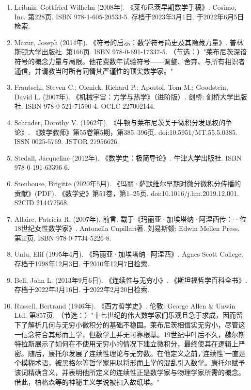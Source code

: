 \begin{enumerate}
\item Leibniz, Gottfried Wilhelm (2008年). 《莱布尼茨早期数学手稿》. Cosimo, Inc. 第228页. ISBN 978-1-605-20533-5. 存档于2023年3月1日. 于2022年6月5日检索.  
\item Mazur, Joseph (2014年). 《符号的启示：数学符号简史及其隐藏力量》. 普林斯顿大学出版社. 第166页. ISBN 978-0-691-17337-5.  
（节选：）"莱布尼茨深谙符号的概念力量与局限。他花费数年试验符号——调整、舍弃、与所有相识者通信，并请教当时所有同情其严谨性的顶尖数学家。"  
\item Frautschi, Steven C.; Olenick, Richard P.; Apostol, Tom M.; Goodstein, David L. (2007年). 《机械宇宙：力学与热学》（进阶版）. 剑桥: 剑桥大学出版社. ISBN 978-0-521-71590-4. OCLC 227002144.  

\item Schrader, Dorothy V. (1962年). 《牛顿与莱布尼茨关于微积分发现权的争论》. 《数学教师》第55卷第5期，第385–396页. doi:10.5951/MT.55.5.0385. ISSN 0025-5769. JSTOR 27956626.  

\item Stedall, Jacqueline (2012年). 《数学史：极简导论》. 牛津大学出版社. ISBN 978-0-191-63396-6.  

\item Stenhouse, Brigitte (2020年5月). 《玛丽·萨默维尔早期对微分微积分传播的贡献》(PDF). 《数学史》第51卷，第1–25页. doi:10.1016/j.hm.2019.12.001. S2CID 214472568.  

\item Allaire, Patricia R. (2007年). 前言. 载于《玛丽亚·加埃塔纳·阿涅西传：一位18世纪女性数学家》. Antonella Cupillari著. 刘易斯顿: Edwin Mellen Press. 第iii页. ISBN 978-0-7734-5226-8.  

\item Unlu, Elif (1995年4月). 《玛丽亚·加埃塔纳·阿涅西》. Agnes Scott College. 存档于1998年12月3日. 于2010年12月7日检索.  

\item Bell, John L. (2013年9月6日). 《连续性与无穷小》. 《斯坦福哲学百科全书》. 存档于2022年3月16日. 于2022年2月20日检索.  

\item Russell, Bertrand (1946年). 《西方哲学史》. 伦敦: George Allen & Unwin Ltd. 第857页.  
（节选：）"十七世纪的伟大数学家们乐观且急于求成，因而留下了解析几何与无穷小微积分的基础不稳固。莱布尼茨相信实无穷小，尽管这一信念符合其形而上学，但数学上并无可靠根基。19世纪中叶后不久，魏尔斯特拉斯展示了如何在不使用无穷小的情况下建立微积分，最终使其在逻辑上严密。随后，康托尔发展了连续性理论与无穷数。在他定义之前，'连续性'一直是个模糊术语，被黑格尔等哲学家用以将形而上学的混乱引入数学。康托尔赋予该词精确含义，并表明他所定义的连续性正是数学家与物理学家所需的概念。借此，柏格森等的神秘主义学说被扫入故纸堆。"  


\end{enumerate}
